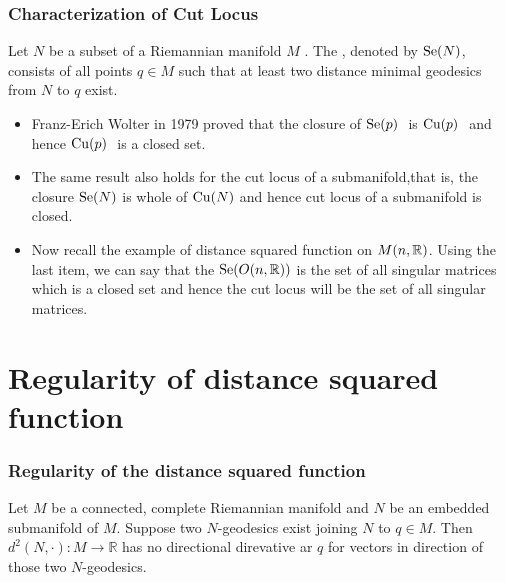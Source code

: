 \documentclass{beamer}
\begin{document}
	\begin{frame}
		\frametitle<presentation>{Characterization of Cut Locus}
		\p 
		\begin{definition}
			Let $N$ be a subset of a Riemannian manifold $M$ . The \emph{}, denoted by $\mathrm{Se}(N)$, \p  consists of all points $q\in M$ such that at least two distance minimal geodesics from $N$ to $q$ exist.
		\end{definition}

		\begin{itemize}
			\p \item Franz-Erich Wolter in 1979 proved that the closure of $\mathrm{Se}(p)~$ is $\mathrm{Cu}(p)~$ \p and hence $\mathrm{Cu}(p)~$ is a closed set.

			\p \item The same result also holds for the cut locus of a submanifold,\p  that is, the closure $\mathrm{Se}(N)$ is whole of $\mathrm{Cu}(N)$ and hence cut locus of a submanifold is closed.

			\p \item Now recall the example of distance squared function on $M(n,\mathbb{R})$. \p Using the last item, we can say that the $\mathrm{Se}(O(n,\mathbb{R}))$ is the set of all singular matrices which is a closed set \p and hence the cut locus will be the set of all singular matrices.
		\end{itemize}
	\end{frame}	



	\section{Regularity of distance squared function}
	
	\begin{frame}
		\frametitle{Regularity of the distance squared function}
		\begin{theorem}
			Let $M$ be a connected, complete Riemannian manifold and $N$ be an embedded submanifold of $M$. Suppose two $N$-geodesics exist joining $N$ to $q\in M$. Then $d^2(N,\cdot):M\to \mathbb{R}$ has no directional direvative ar $q$ for vectors in direction of those two $N$-geodesics.
		\end{theorem}
	\end{frame}



	
\end{document}
